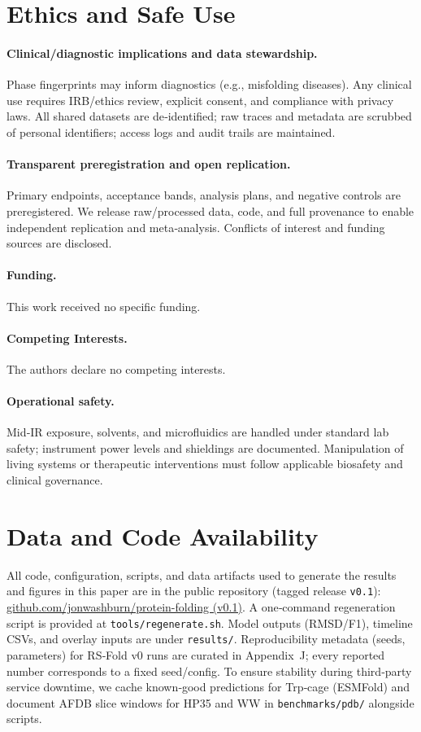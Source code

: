 \documentclass[12pt,a4paper]{article}
\begin{document}
\section{Ethics and Safe Use}

\paragraph{Clinical/diagnostic implications and data stewardship.}
Phase fingerprints may inform diagnostics (e.g., misfolding diseases). Any clinical use requires IRB/ethics review, explicit consent, and compliance with privacy laws. All shared datasets are de‑identified; raw traces and metadata are scrubbed of personal identifiers; access logs and audit trails are maintained.

\paragraph{Transparent preregistration and open replication.}
Primary endpoints, acceptance bands, analysis plans, and negative controls are preregistered. We release raw/processed data, code, and full provenance to enable independent replication and meta‑analysis. Conflicts of interest and funding sources are disclosed.

\paragraph{Funding.}
This work received no specific funding.
\paragraph{Competing Interests.}
The authors declare no competing interests.

\paragraph{Operational safety.}
Mid‑IR exposure, solvents, and microfluidics are handled under standard lab safety; instrument power levels and shieldings are documented. Manipulation of living systems or therapeutic interventions must follow applicable biosafety and clinical governance.

\section{Data and Code Availability}
All code, configuration, scripts, and data artifacts used to generate the results and figures in this paper are in the public repository (tagged release \texttt{v0.1}): \href{https://github.com/jonwashburn/protein-folding/tree/v0.1}{github.com/jonwashburn/protein-folding (v0.1)}. A one‑command regeneration script is provided at \texttt{tools/regenerate.sh}. Model outputs (RMSD/F1), timeline CSVs, and overlay inputs are under \texttt{results/}. Reproducibility metadata (seeds, parameters) for RS‑Fold v0 runs are curated in Appendix~J; every reported number corresponds to a fixed seed/config. To ensure stability during third‑party service downtime, we cache known‑good predictions for Trp‑cage (ESMFold) and document AFDB slice windows for HP35 and WW in \texttt{benchmarks/pdb/} alongside scripts.
\end{document}
